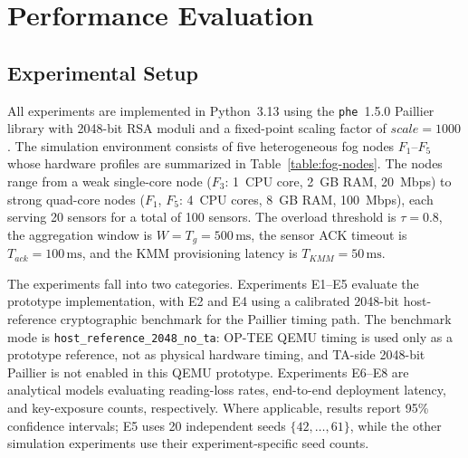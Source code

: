 \documentclass[conference]{IEEEtran}
\begin{document}
    \section{Performance Evaluation}
    \label{sec:evaluation}

    \subsection{Experimental Setup}
    \label{sec:eval-setup}

    All experiments are implemented in Python~3.13 using the \texttt{phe}~1.5.0 Paillier library with 2048-bit RSA moduli and a fixed-point scaling factor of $scale=1000$. The simulation environment consists of five heterogeneous fog nodes $F_1$--$F_5$ whose hardware profiles are summarized in Table~\ref{table:fog-nodes}. The nodes range from a weak single-core node ($F_3$: 1~CPU core, 2~GB RAM, 20~Mbps) to strong quad-core nodes ($F_1$, $F_5$: 4~CPU cores, 8~GB RAM, 100~Mbps), each serving 20 sensors for a total of 100 sensors. The overload threshold is $\tau=0.8$, the aggregation window is $W=T_g=500\,\text{ms}$, the sensor ACK timeout is $T_{ack}=100\,\text{ms}$, and the KMM provisioning latency is $T_{KMM}=50\,\text{ms}$.

    \begin{table}[htbp]
    \caption{Fog Node Hardware Profiles Used in Simulation}
    \label{table:fog-nodes}
    \centering
    \end{table}

    The experiments fall into two categories. Experiments E1--E5 evaluate the prototype implementation, with E2 and E4 using a calibrated 2048-bit host-reference cryptographic benchmark for the Paillier timing path. The benchmark mode is \texttt{host\_reference\_2048\_no\_ta}: OP-TEE QEMU timing is used only as a prototype reference, not as physical hardware timing, and TA-side 2048-bit Paillier is not enabled in this QEMU prototype. Experiments E6--E8 are analytical models evaluating reading-loss rates, end-to-end deployment latency, and key-exposure counts, respectively. Where applicable, results report 95\% confidence intervals; E5 uses 20 independent seeds $\{42,\ldots,61\}$, while the other simulation experiments use their experiment-specific seed counts.
\end{document}
